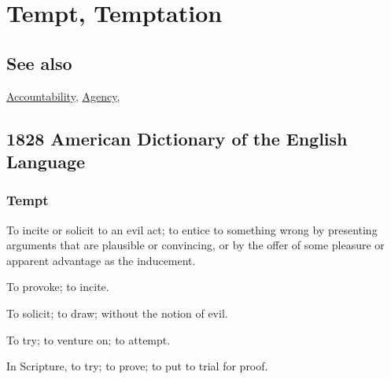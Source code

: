 \section{Tempt, Temptation}
	\label{TEMPTATION}
	
\subsection{See also}

	\hyperref[ACCOUNTABILITY]{Accountability}, \hyperref[AGENCY]{Agency},

\subsection{1828 American Dictionary of the English Language} %
	\label{TEMPTATION-1828}
	
	\subsubsection{Tempt}

		\begin{compactitem}
			\item To incite or solicit to an evil act; to entice to something wrong by presenting arguments that are plausible or convincing, or by the offer of some pleasure or apparent advantage as the inducement.
			\item To provoke; to incite.
			\item To solicit; to draw; without the notion of evil.
			\item To try; to venture on; to attempt.
			\item In Scripture, to try; to prove; to put to trial for proof.
		\end{compactitem}


	
